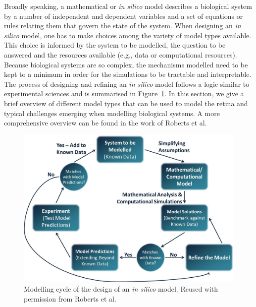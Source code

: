 \documentclass{article}
\begin{document}
Broadly speaking, a mathematical or \textit{in silico} model describes a biological system by a number of independent and dependent variables and a set of equations or rules relating them that govern the state of the system.
When designing an \textit{in silico} model, one has to make choices among the variety of model types available.
This choice is informed by the system to be modelled, the question to be answered and the resources available (e.g., data or computational resources).
Because biological systems are so complex, the mechanisms modelled need to be kept to a minimum in order for the simulations to be tractable and interpretable.
The process of designing and refining an \textit{in silico} model follows a logic similar to experimental sciences and is summarised in Figure~\ref{fig:ModellingCycle}.
In this section, we give a brief overview of different model types that can be used to model the retina and typical challenges emerging when modelling biological systems.
A more comprehensive overview can be found in the work of Roberts et al.\cite{Roberts_2016}

\begin{figure}[t!]
  \centering
  \includegraphics[width=.9\linewidth]{ModellingCycle}
  \caption{Modelling cycle of the design of an \textit{in silico} model. Reused with permission from Roberts et al.\cite{Roberts_2016}}
  \label{fig:ModellingCycle}
\end{figure}
\end{document}

